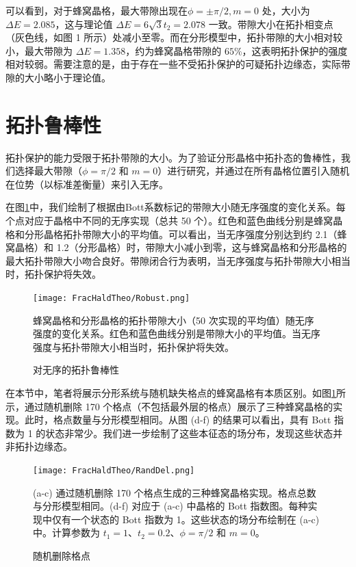 可以看到，对于蜂窝晶格，最大带隙出现在$\phi=±π/2, m=0$ 处，大小为 $\Delta E=2.085$，这与理论值 $\Delta E=6\sqrt{3}t_2=2.078$ 一致。带隙大小在拓扑相变点（灰色线，如图 1 所示）处减小至零。而在分形模型中，拓扑带隙的大小相对较小，最大带隙为 $\Delta E=1.358$，约为蜂窝晶格带隙的 $65\%$，这表明拓扑保护的强度相对较弱。需要注意的是，由于存在一些不受拓扑保护的可疑拓扑边缘态，实际带隙的大小略小于理论值。

\section{拓扑鲁棒性}

拓扑保护的能力受限于拓扑带隙的大小。为了验证分形晶格中拓扑态的鲁棒性，我们选择最大带隙（$\phi = \pi/2$ 和 $m = 0$）进行研究，并通过在所有晶格位置引入随机在位势（以标准差衡量）来引入无序。

在图\ref{fig:Robust}中，我们绘制了根据由Bott系数标记的带隙大小随无序强度的变化关系。每个点对应于晶格中不同的无序实现（总共 50 个）。红色和蓝色曲线分别是蜂窝晶格和分形晶格拓扑带隙大小的平均值。可以看出，当无序强度分别达到约 2.1（蜂窝晶格）和 1.2（分形晶格）时，带隙大小减小到零，这与蜂窝晶格和分形晶格的最大拓扑带隙大小吻合良好。带隙闭合行为表明，当无序强度与拓扑带隙大小相当时，拓扑保护将失效。

\begin{figure}[htbp]
    \centering
    \texttt{[image: FracHaldTheo/Robust.png]}
    \caption{对无序的拓扑鲁棒性}蜂窝晶格和分形晶格的拓扑带隙大小（50 次实现的平均值）随无序强度的变化关系。红色和蓝色曲线分别是带隙大小的平均值。当无序强度与拓扑带隙大小相当时，拓扑保护将失效。
    \label{fig:Robust}
\end{figure}

在本节中，笔者将展示分形系统与随机缺失格点的蜂窝晶格有本质区别。如图\ref{fig:Robust}所示，通过随机删除 170 个格点（不包括最外层的格点）展示了三种蜂窝晶格的实现。此时，格点数量与分形模型相同。从图 (d-f) 的结果可以看出，具有 Bott 指数为 1 的状态非常少。我们进一步绘制了这些本征态的场分布，发现这些状态并非拓扑边缘态。

\begin{figure}[htbp]
    \centering
    \texttt{[image: FracHaldTheo/RandDel.png]}
    \caption{随机删除格点}(a-c) 通过随机删除 170 个格点生成的三种蜂窝晶格实现。格点总数与分形模型相同。(d-f) 对应于 (a-c) 中晶格的 Bott 指数图。每种实现中仅有一个状态的 Bott 指数为 1。这些状态的场分布绘制在 (a-c) 中。计算参数为 $t_1 = 1$、$t_2 = 0.2$、$\phi = \pi/2$ 和 $m = 0$。
    \label{fig:RandDel}
\end{figure}

